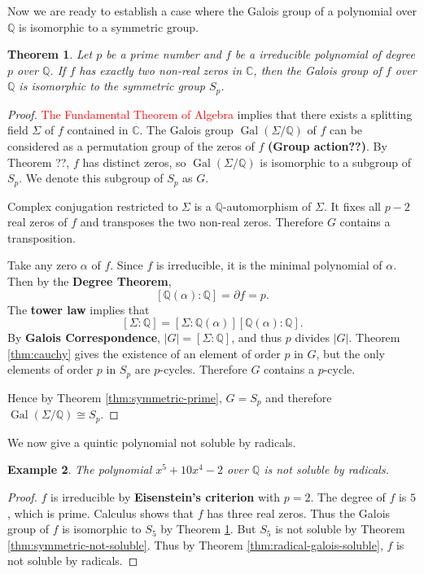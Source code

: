 \documentclass[12pt]{article}
\newtheorem{theorem}{Theorem}
\newtheorem{example}[theorem]{Example}
\newcommand{\Gal}{\operatorname{Gal}}
\begin{document}
Now we are ready to establish a case where the Galois group of a polynomial over $\mathbb Q$ is isomorphic to a symmetric group.

\begin{theorem} \label{thm:galois-iso-symmetric}
    Let $p$ be a prime number and $f$ be a irreducible polynomial of degree $p$ over $\mathbb Q$. If $f$ has exactly two non-real zeros in $\mathbb C$, then the Galois group of $f$ over $\mathbb Q$ is isomorphic to the symmetric group $S_p$.
\end{theorem}

\begin{proof}
    \textcolor{red}{The Fundamental Theorem of Algebra} implies that there exists a splitting field $\Sigma $ of $f$ contained in $\mathbb C$. The Galois group $\Gal(\Sigma / \mathbb Q)$ of $f$ can be considered as a permutation group of the zeros of $f$ \textbf{(Group action??)}. By Theorem ??, $f$ has distinct zeros, so $\Gal(\Sigma / \mathbb Q)$ is isomorphic to a subgroup of $S_p$. We denote this subgroup of $S_p$ as $G$. 

    Complex conjugation restricted to $\Sigma$ is a $\mathbb Q$-automorphism of $\Sigma$. It fixes all $p - 2$ real zeros of $f$ and transposes the two non-real zeros. Therefore $G$ contains a transposition. 

    Take any zero $\alpha$ of $f$. Since $f$ is irreducible, it is the minimal polynomial of $\alpha$. Then by the \textbf{Degree Theorem}, $$[\mathbb Q(\alpha) : \mathbb Q] = \partial f = p. $$ The \textbf{tower law} implies that $$[\Sigma : \mathbb Q] = [\Sigma : \mathbb Q(\alpha)] [ \mathbb Q(\alpha) : \mathbb Q]. $$ By \textbf{Galois Correspondence}, $|G| = [\Sigma : \mathbb Q]$, and thus $p$ divides $|G|$. Theorem \ref{thm:cauchy} gives the existence of an element of order $p$ in $G$, but the only elements of order $p$ in $S_p$ are $p$-cycles. Therefore $G$ contains a $p$-cycle.

    Hence by Theorem \ref{thm:symmetric-prime}, $ G = S_p$ and therefore $\Gal(\Sigma / \mathbb Q) \cong S_p$.
\end{proof}

We now give a quintic polynomial not soluble by radicals. 

\begin{example}
    The polynomial $x^5 + 10 x^4 - 2$ over $\mathbb Q$ is not soluble by radicals.
\end{example}

\begin{proof}
    $f$ is irreducible by \textbf{Eisenstein's criterion} with $p = 2$. The degree of $f$ is $5$, which is prime. Calculus shows that $f$ has three real zeros. Thus the Galois group of $f$ is isomorphic to $S_5$ by Theorem \ref{thm:galois-iso-symmetric}. But $S_5$ is not soluble by Theorem \ref{thm:symmetric-not-soluble}. Thus by Theorem \ref{thm:radical-galois-soluble}, $f$ is not soluble by radicals.
\end{proof}
\end{document}
